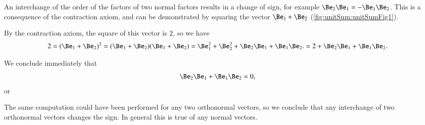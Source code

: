 %
%
An interchange of the order of the factors of two normal factors results in a change of sign,
for example \( \Be_2 \Be_1 = -\Be_1 \Be_2 \).
This is a consequence of the contraction axiom, and can be demonstrated by squaring the vector
\( \Be_1 + \Be_2 \) (\cref{fig:unitSum:unitSumFig1}).

By the contraction axiom, the square of this vector is \( 2 \), so we have
\begin{dmath}\label{eqn:normalVectors:80}
2 =
(\Be_1 + \Be_2)^2
= (\Be_1 + \Be_2)(\Be_1 + \Be_2)
= \Be_1^2 + \Be_2^2 + \Be_2 \Be_1 + \Be_1 \Be_2.
= 2 + \Be_2 \Be_1 + \Be_1 \Be_2.
\end{dmath}

We conclude immediately that
\begin{dmath}\label{eqn:normalVectors:280}
\Be_2 \Be_1 + \Be_1 \Be_2 = 0,
\end{dmath}
or

The same computation could have been performed for any two orthonormal vectors, so we conclude that any interchange of two orthonormal vectors changes the sign.
In general this is true of any normal vectors.

